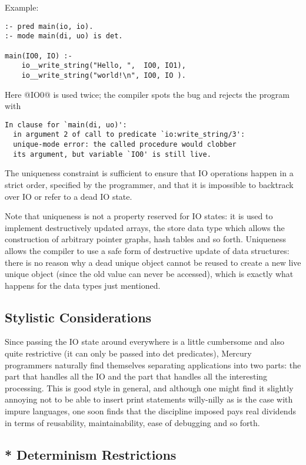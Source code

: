\documentclass[a4paper,11pt,notitlepage,onecolumn]{article}
\begin{document}
Example:
\begin{verbatim}
:- pred main(io, io).
:- mode main(di, uo) is det.

main(IO0, IO) :-
    io__write_string("Hello, ",  IO0, IO1),
    io__write_string("world!\n", IO0, IO ).
\end{verbatim}
Here @IO0@ is used twice; the compiler spots the bug and
rejects the program with
\begin{verbatim}
In clause for `main(di, uo)':
  in argument 2 of call to predicate `io:write_string/3':
  unique-mode error: the called procedure would clobber
  its argument, but variable `IO0' is still live.
\end{verbatim}
The uniqueness constraint is sufficient to ensure that IO
operations happen in a strict order, specified by the
programmer, and that it is impossible to backtrack over IO or
refer to a dead IO state.

Note that uniqueness is not a property reserved for IO states:
it is used to implement destructively updated arrays, the
store data type which allows the construction of arbitrary
pointer graphs, hash tables and so forth.  Uniqueness allows
the compiler to use a safe form of destructive update of data
structures: there is no reason why a dead unique object cannot
be reused to create a new live unique object (since the old
value can never be accessed), which is exactly what happens
for the data types just mentioned.

\subsection{Stylistic Considerations}

Since passing the IO state around everywhere is a little
cumbersome and also quite restrictive (it can only be passed
into det predicates), Mercury programmers naturally find
themselves separating applications into two parts: the part
that handles all the IO and the part that handles all the
interesting processing.  This is good style in general, and
although one might find it slightly annoying not to be able to
insert print statements willy-nilly as is the case with impure
languages, one soon finds that the discipline imposed pays
real dividends in terms of reusability, maintainability, ease
of debugging and so forth.

\subsection{* Determinism Restrictions}
\end{document}
